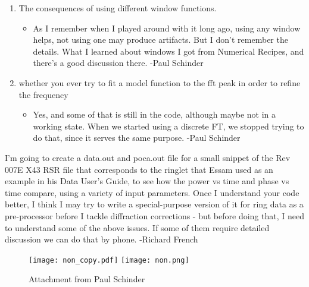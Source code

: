 \documentclass[crop=false,class=article,oneside]{standalone}
\begin{document}
\begin{enumerate}
\begin{itemize}
    \end{itemize}
    \item The consequences of using different window functions.
    \begin{itemize}
        \item As I remember when I played around with it long ago, using any window helps, not using one may produce artifacts.  But I don’t remember the details.  What I learned about windows I got from Numerical Recipes, and there’s a good discussion there. -Paul Schinder
    \end{itemize}
    \item whether you ever try to fit a model function to the fft peak in order to refine the frequency
    \begin{itemize}
        \item Yes, and some of that is still in the code, although maybe not in a working state.  When we started using a discrete FT, we stopped trying to do that, since it serves the same purpose. -Paul Schinder
    \end{itemize}
\end{enumerate}
I'm going to create a data.out and poca.out file for a small snippet of the Rev 007E X43 RSR file that corresponds to the ringlet that Essam used as an example in his Data User's Guide, to see how the power vs time and phase vs time compare, using a variety of input parameters. Once I understand your code better, I think I may try to write a special-purpose version of it for ring data as a pre-processor before I tackle diffraction corrections - but before doing that, I need to understand  some of the above issues. If some of them require detailed discussion we can do that by phone. -Richard French
\begin{figure}[H]
    \centering
    \captionsetup{type=figure}
    \texttt{[image: non\_copy.pdf]}
    \hfill
    \texttt{[image: non.png]}
    \caption{Attachment from Paul Schinder}
\end{figure}
\end{document}
